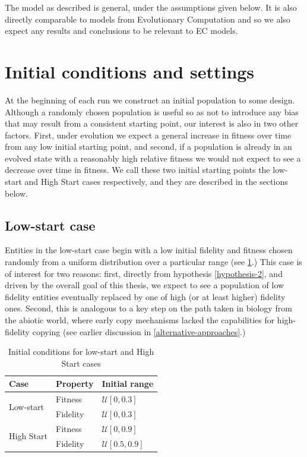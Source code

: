 The model as described is general, under the assumptions given below. It is also directly comparable to models from Evolutionary Computation and so we also expect any results and conclusions to be relevant to EC models.


\section{Initial conditions and settings}\label{initial-conditions}

At the beginning of each run we construct an initial population to some design. Although a randomly chosen population is useful so as not to introduce any bias that may result from a consistent starting point, our interest is also in two other factors. First, under evolution we expect a general increase in fitness over time from any low initial starting point, and second, if a population is already in an evolved state with a reasonably high relative fitness we would not expect to see a decrease over time in fitness. We call these two initial starting points the low-start and High Start cases respectively, and they are described in the sections below.

\subsection{Low-start case}\label{low-start-case}

Entities in the low-start case begin with a low initial fidelity and fitness chosen randomly from a uniform distribution over a particular range (see \cref{tbl:ic}.) This case is of interest for two reasons: first, directly from hypothesis \autoref{hypothesis-2}, and driven by the overall goal of this thesis, we expect to see a population of low fidelity entities  eventually replaced by one of high (or at least higher) fidelity ones. Second, this is analogous to a key step on the path taken in biology from the abiotic world, where early copy mechanisms lacked the capabilities for high-fidelity copying (see earlier discussion in \cref{alternative-approaches}.)

\begin{table}[t]
	\begin{center}
		\caption{Initial conditions for low-start and High Start cases}\label{tbl:ic}
		\begin{tabular}{@{}lll@{}}
			\toprule
			Case                        & Property & Initial range           \\
			\midrule
			\multirow{2}{*}{Low-start}  & Fitness  & $\mathcal{U}[0, 0.3]$   \\
                         & Fidelity & $\mathcal{U}[0, 0.3]$   \\
			\midrule
			\multirow{2}{*}{High Start} & Fitness  & $\mathcal{U}[0, 0.9]$   \\
                         & Fidelity & $\mathcal{U}[0.5, 0.9]$ \\
			\bottomrule
		\end{tabular}
	\end{center}
\end{table}

